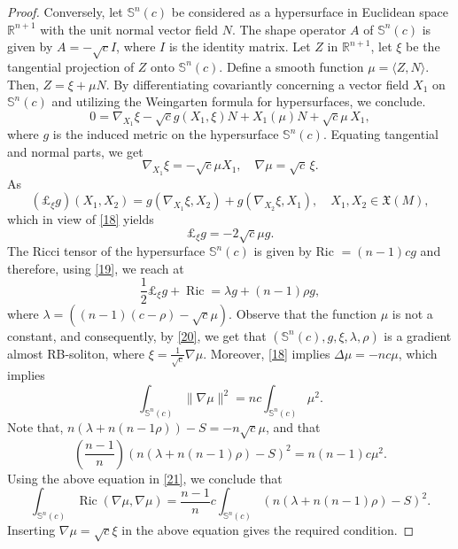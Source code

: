 \documentclass[a4paper, twoside, 10pt]{article}
\numberwithin{equation}{section}
\theoremstyle{definition}
\begin{document}
\begin{proof}
Conversely, let \(\mathbb{S}^{n}(c)\) be considered as a hypersurface in Euclidean space \(\mathbb{R}^{n+1}\) with the unit normal vector field \(N\). The shape operator \(A\) of \(\mathbb{S}^{n}(c)\) is given by  \(A = -\sqrt{c}I\), where \(I\) is the identity matrix. 
Let \(Z\) in \(\mathbb{R}^{n+1}\), let \(\xi\) be the tangential projection of \(Z\) onto \(\mathbb{S}^{n}(c)\).
 Define a smooth function \(\mu = \langle Z, N \rangle\). Then, \(Z = \xi + \mu N\). By differentiating covariantly concerning a vector field \(X_1\) on \(\mathbb{S}^{n}(c)\) and utilizing the Weingarten formula for hypersurfaces, we conclude.
\[
0=\nabla_{X_1} \xi-\sqrt{c} g(X_1, \xi) N+X_1(\mu) N+\sqrt{c} \mu\, X_1,
\]
where $g$ is the induced metric on the hypersurface $\mathbb{S}^{n}(c)$. Equating tangential and normal parts, we get
\begin{equation}\label{18}
\nabla_{X_1} \xi=-\sqrt{c} \mu X_1, \quad \nabla \mu=\sqrt{c} \,\xi.
\end{equation}
As
\[
\left(\pounds_{\xi} g\right)(X_1, X_2)=g\left(\nabla_{X_1} \xi, X_2\right)+g\left(\nabla_{X_2} \xi, X_1\right), \quad X_1, X_2 \in \mathfrak{X}(M),
\]
which in view of \eqref{18} yields
\begin{equation}\label{19}
    \pounds_{\xi} g=-2 \sqrt{c} \mu g .
\end{equation}
The Ricci tensor of the hypersurface $\mathbb{S}^{n}(c)$ is given by Ric $=(n-1) c g$ and therefore, using  \eqref{19}, we reach at
\begin{equation}\label{20}
    \frac{1}{2} \pounds_{\xi} g+\operatorname{Ric}=\lambda g +(n-1)\rho g,
\end{equation}
where $\lambda=((n-1)(c- \rho)-\sqrt{c} \mu)$. Observe that the function $\mu$ is not a constant, and consequently, by \eqref{20}, we get that $\left(\mathbb{S}^{n}(c), g, \xi, \lambda,\rho\right)$ is a gradient almost RB-soliton, where $\xi=\frac{1}{\sqrt{c}} \nabla \mu$. Moreover, \eqref{18} implies  
$\Delta \mu=-n c \mu$, which implies
\begin{equation}\label{21}
    \int_{\mathbb{S}^{n}(c)}\|\nabla \mu\|^{2}=n c \int_{\mathbb{S}^{n}(c)} \mu^{2}.
\end{equation}
Note that, $n (\lambda+ n(n-1\rho))-S=-n \sqrt{c} \mu$, and that
$$
\left(\frac{n-1}{n}\right)(n (\lambda+n(n-1)\rho)-S)^{2}=n(n-1) c \mu^{2}.
$$
Using the above equation in \eqref{21}, we conclude that
$$
\int_{\mathbb{S}^{n}(c)} \operatorname{Ric}(\nabla \mu, \nabla \mu)=\frac{n-1}{n} c \int_{\mathbb{S}^{n}(c)}(n (\lambda+n(n-1)\rho)-S)^{2} .
$$
Inserting $\nabla\mu=\sqrt{c} \xi$ in the above equation gives the required condition.
\end{proof}
\end{document}
